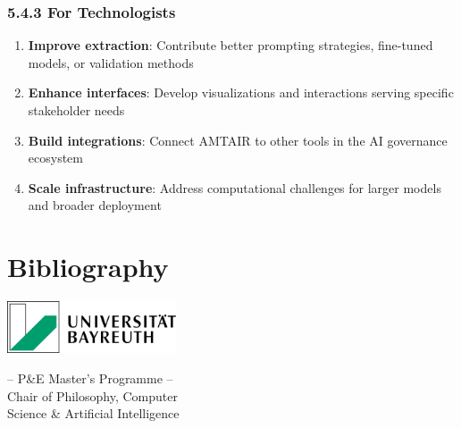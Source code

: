 \documentclass[
  11pt,
  letterpaper,
]{book}
\providecommand{\tightlist}{%
  \setlength{\itemsep}{0pt}\setlength{\parskip}{0pt}}
\begin{document}
\subsection{5.4.3 For
Technologists}\label{sec-technologist-recommendations}

\begin{enumerate}
\def\labelenumi{\arabic{enumi}.}
\tightlist
\item
  \textbf{Improve extraction}: Contribute better prompting strategies,
  fine-tuned models, or validation methods
\item
  \textbf{Enhance interfaces}: Develop visualizations and interactions
  serving specific stakeholder needs
\item
  \textbf{Build integrations}: Connect AMTAIR to other tools in the AI
  governance ecosystem
\item
  \textbf{Scale infrastructure}: Address computational challenges for
  larger models and broader deployment
\end{enumerate}


\chapter*{Bibliography}\label{bibliography}


\printbibliography[heading=none]


\backmatter
\printbibliography[title=Bibliography]



\clearpage
\thispagestyle{empty} %

\newpage


\begin{minipage}{0.3\textwidth}
  \includegraphics[width=5cm]{latex/uni-bayreuth-logo.png}
\end{minipage}
\hfill
\begin{minipage}{0.9\textwidth}
  \begin{center}
    -- P\&E Master's Programme --\\
    Chair of Philosophy, Computer\\
    Science \& Artificial Intelligence
  \end{center}
\end{minipage}
\end{document}
